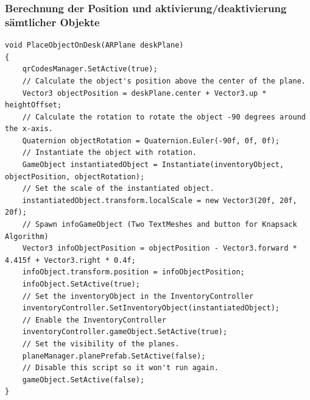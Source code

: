 \subsubsection{Berechnung der Position und aktivierung/deaktivierung sämtlicher Objekte}
\begin{lstlisting}[style=csharp, caption={}, label=code:placeobject]
void PlaceObjectOnDesk(ARPlane deskPlane)
{
    qrCodesManager.SetActive(true);
    // Calculate the object's position above the center of the plane.
    Vector3 objectPosition = deskPlane.center + Vector3.up * heightOffset;
    // Calculate the rotation to rotate the object -90 degrees around the x-axis.
    Quaternion objectRotation = Quaternion.Euler(-90f, 0f, 0f);
    // Instantiate the object with rotation.
    GameObject instantiatedObject = Instantiate(inventoryObject, objectPosition, objectRotation);
    // Set the scale of the instantiated object.
    instantiatedObject.transform.localScale = new Vector3(20f, 20f, 20f);
    // Spawn infoGameObject (Two TextMeshes and button for Knapsack Algorithm)
    Vector3 infoObjectPosition = objectPosition - Vector3.forward * 4.415f + Vector3.right * 0.4f;
    infoObject.transform.position = infoObjectPosition;
    infoObject.SetActive(true);
    // Set the inventoryObject in the InventoryController
    inventoryController.SetInventoryObject(instantiatedObject);
    // Enable the InventoryController
    inventoryController.gameObject.SetActive(true);
    // Set the visibility of the planes.
    planeManager.planePrefab.SetActive(false);
    // Disable this script so it won't run again.
    gameObject.SetActive(false);
}
\end{lstlisting}

